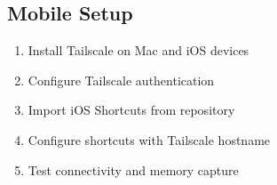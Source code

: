 \documentclass[11pt,letterpaper]{article}
\begin{document}
\subsection{Mobile Setup}

\begin{enumerate}
\item Install Tailscale on Mac and iOS devices
\item Configure Tailscale authentication
\item Import iOS Shortcuts from repository
\item Configure shortcuts with Tailscale hostname
\item Test connectivity and memory capture
\end{enumerate}
\end{document}
